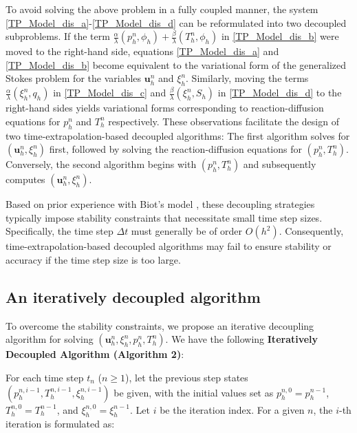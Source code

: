 \documentclass{article}
\newtheorem{remark}{Remark}
\numberwithin{equation}{section}
\begin{document}
To avoid solving the above problem in a fully coupled manner, the system \eqref{TP_Model_dis_a}-\eqref{TP_Model_dis_d} can be reformulated into two decoupled subproblems. If the term \(\frac{\alpha}{\lambda}(p^n_h, \phi_h) + \frac{\beta}{\lambda}(T^n_h, \phi_h)\) in \eqref{TP_Model_dis_b} were moved to the right-hand side, equations \eqref{TP_Model_dis_a} and \eqref{TP_Model_dis_b} become equivalent to the variational form of the generalized Stokes problem for the variables \(\bm{u}_h^n\) and \(\xi_h^n\). Similarly, moving the terms \(\frac{\alpha}{\lambda}(\xi_h^n, q_h)\) in \eqref{TP_Model_dis_c} and \(\frac{\beta}{\lambda}(\xi_h^n, S_h)\) in \eqref{TP_Model_dis_d} to the right-hand sides yields variational forms corresponding to reaction-diffusion equations for \(p_h^n\) and \(T_h^n\) respectively.
These observations facilitate the design of two time-extrapolation-based decoupled algorithms: The first algorithm solves for \((\bm{u}_h^n, \xi_h^n)\) first, followed by solving the reaction-diffusion equations for \((p_h^n, T_h^n)\). Conversely, the second algorithm begins with \((p_h^n, T_h^n)\) and subsequently computes \((\bm{u}_h^n, \xi_h^n)\).

Based on prior experience with Biot’s model \cite{feng2017analysis, ju2020parameter}, these decoupling strategies typically impose stability constraints that necessitate small time step sizes. Specifically, the time step \(\Delta t\) must generally be of order \(O(h^2)\). Consequently, time-extrapolation-based decoupled algorithms may fail to ensure stability or accuracy if the time step size is too large.
    

\subsection{An iteratively decoupled algorithm  }

To overcome the stability constraints, we propose an iterative decoupling algorithm for solving \((\bm{u}_h^n, \xi_h^n, p_h^n, T_h^n)\). We have the following \textbf{Iteratively Decoupled Algorithm (Algorithm 2)}:

For each time step \(t_n\) (\(n \geq 1\)), let the previous step states \((p_h^{n,i-1}, T_h^{n,i-1}, \xi_h^{n,i-1})\) be given, with the initial values set as \(p_h^{n,0} = p_h^{n-1}\), \(T_h^{n,0} = T_h^{n-1}\), and \(\xi_h^{n,0} = \xi_h^{n-1}\). Let \(i\) be the iteration index. For a given \(n\), the \(i\)-th iteration is formulated as:   
 
\end{document}
